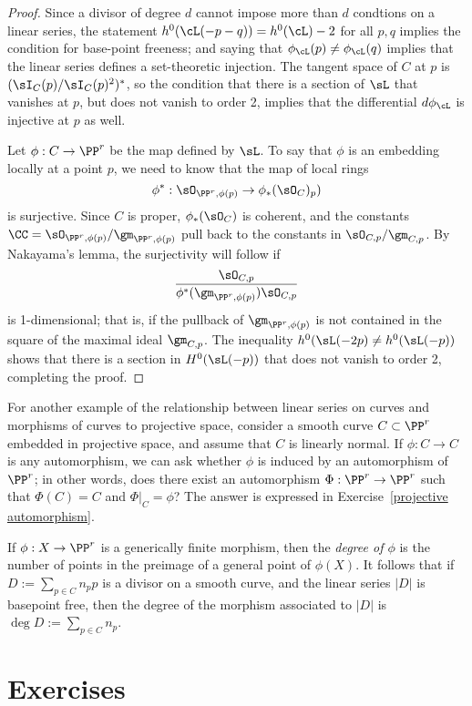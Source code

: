 \begin{proof}
Since a divisor of degree $d$ cannot impose more than $d$ condtions on a linear series, the statement $h^0(\cL(-p-q)) = h^0(\cL) - 2$ for all $p, q$ implies the condition for base-point freeness; and saying that $\phi_\cL(p) \neq \phi_\cL(q)$ implies that the linear series defines a set-theoretic injection. The tangent space of $C$ at $p$ is $(\sI_C(p)/\sI_C(p)^2)^*$, so the condition that there is a section of $\sL$ that vanishes at $p$, but does not vanish
to order 2, implies that the differential $d\phi_\cL$ is injective at $p$ as well.

Let $\phi:C \to \PP^r$ be the map defined by $\sL$. To say that $\phi$  is an embedding locally at a point $p$, we need to know that the map of local rings
$$
\phi^*: \sO_{\PP^r,\phi(p)} \to \phi_*(\sO_{C})_p)
$$
is surjective. Since $C$ is proper,  $\phi_*(\sO_{C})$ is coherent, 
and the constants  $\CC =\sO_{\PP^r,\phi(p)}/\gm_{\PP^r,\phi(p)}$ pull back to the constants in
$\sO_{C,p}/\gm_{C,p}$. 
By Nakayama's lemma, the surjectivity will follow if 
$$
\frac{\sO_{C,p}}
{\phi^*(\gm_{\PP^r,\phi(p)})  \sO_{C,p}}
$$
is 1-dimensional; that is, if  the pullback of $\gm_{\PP^r,\phi(p)}$ is not contained in the square of the
maximal ideal $\gm_{C,p}$. The inequality $h^0(\sL(-2p) \neq h^0(\sL(-p))$ shows that there is a 
section in $H^0(\sL(-p))$ that does not vanish to order 2, completing the proof.
\end{proof}


For another example of the relationship between linear series on curves and morphisms of curves to projective space, consider a smooth curve $C \subset \PP^r$ embedded in projective space, and assume that $C$ is linearly normal. If $\phi : C \to C$ is any automorphism, we can ask whether $\phi$ is induced by an automorphism of $\PP^r$; in other words, does there exist an automorphism $\Phi : \PP^r \to \PP^r$ such that $\Phi(C) = C$ and $\Phi|_C = \phi$? The answer is expressed in Exercise~\ref{projective automorphism}.


If $\phi:X \to \PP^r$ is a generically finite morphism, then the \emph{degree of $\phi$} is the number of points in the preimage of a general point of $\phi(X)$. It follows that if $D := \sum_{p\in C} n_pp$ is a divisor on a smooth curve, and the linear series $|D|$ is basepoint free, then the degree of the morphism associated to $|D|$ is $\deg D := \sum_{p\in C} n_p$.

\section{Exercises}

